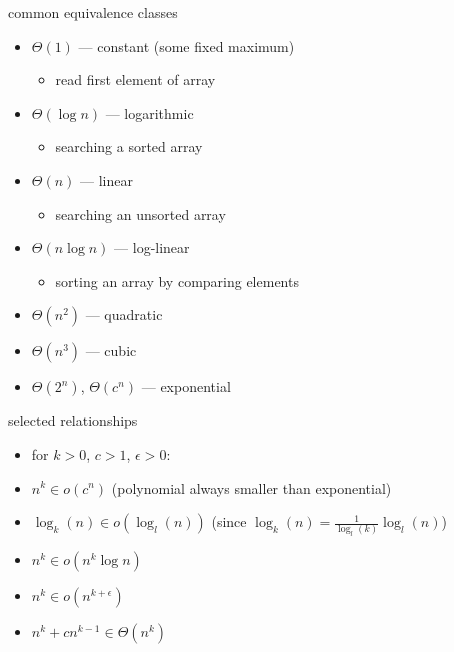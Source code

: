 \begin{frame}{common equivalence classes}
\begin{itemize}
\item $\Theta(1)$ --- constant (some fixed maximum)
    \begin{itemize}
    \item read first element of array
    \end{itemize}
\item $\Theta(\log n)$ --- logarithmic
    \begin{itemize}
    \item searching a sorted array
    \end{itemize}
\item $\Theta(n)$ --- linear
    \begin{itemize}
    \item searching an unsorted array
    \end{itemize}
\item $\Theta(n\log n)$ --- log-linear
    \begin{itemize}
    \item sorting an array by comparing elements
    \end{itemize}
\item $\Theta(n^2)$ --- quadratic
\item $\Theta(n^3)$ --- cubic
\item $\Theta(2^n)$, $\Theta(c^n)$ --- exponential
\end{itemize}
\end{frame}

\begin{frame}{selected relationships}
\begin{itemize}
\item for $k>0$, $c>1$, $\epsilon>0$:
\item $n^k \in o(c^n)$ (polynomial always smaller than exponential)
\item $\log_k(n) \in o(\log_l(n))$ (since $\log_k(n) = \frac{1}{\log_l(k)}\log_l(n)$)
\item $n^k \in o(n^k \log n)$
\item $n^k \in o(n^{k+\epsilon})$
\item $n^k+cn^{k-1} \in \Theta(n^k)$
\end{itemize}
\end{frame}
